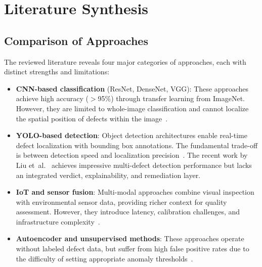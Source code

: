 \documentclass{ieeeaccess}
\begin{document}
\section{Literature Synthesis}
\label{sec:synthesis}

\subsection{Comparison of Approaches}
The reviewed literature reveals four major categories of approaches, each with distinct strengths and limitations:

\begin{itemize}
    \item \textbf{CNN-based classification} (ResNet, DenseNet, VGG): These approaches achieve high accuracy ($>$95\%) through transfer learning from ImageNet. However, they are limited to whole-image classification and cannot localize the spatial position of defects within the image~\cite{resnet50defect2025, thermoforming2021}.
    
    \item \textbf{YOLO-based detection}: Object detection architectures enable real-time defect localization with bounding box annotations. The fundamental trade-off is between detection speed and localization precision~\cite{defectdetection2024, industrialsystem2025, ijisrt2024}. The recent work by Liu et~al.~\cite{liu2025foodpkg} achieves impressive multi-defect detection performance but lacks an integrated verdict, explainability, and remediation layer.
    
    \item \textbf{IoT and sensor fusion}: Multi-modal approaches combine visual inspection with environmental sensor data, providing richer context for quality assessment. However, they introduce latency, calibration challenges, and infrastructure complexity~\cite{aiot2024, rfidaiot2025}.
    
    \item \textbf{Autoencoder and unsupervised methods}: These approaches operate without labeled defect data, but suffer from high false positive rates due to the difficulty of setting appropriate anomaly thresholds~\cite{autoencoder2024}.
\end{itemize}
\end{document}
